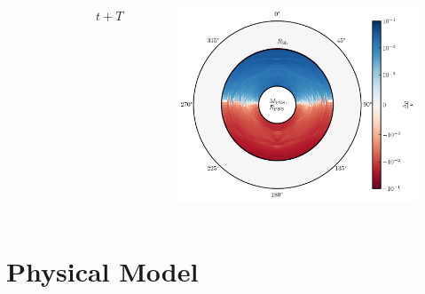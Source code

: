 \documentclass{beamer}
\begin{document}
\begin{frame}
\begin{columns}[c]
\begin{figure}[htb!]
      \end{figure}
      \centerline{$t+T$}
      \begin{figure}[htb!]
        \centering
        \includegraphics[width=\textwidth]{fig.AF_P_1.00T.png}
      \end{figure}

  \end{columns}

\end{frame}

\section{Physical Model}
\end{document}

